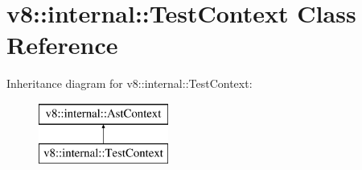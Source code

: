 \hypertarget{classv8_1_1internal_1_1_test_context}{}\section{v8\+:\+:internal\+:\+:Test\+Context Class Reference}
\label{classv8_1_1internal_1_1_test_context}
Inheritance diagram for v8\+:\+:internal\+:\+:Test\+Context\+:\begin{figure}[H]
\begin{center}
\leavevmode
\includegraphics[height=2.000000cm]{classv8_1_1internal_1_1_test_context}
\end{center}
\end{figure}
